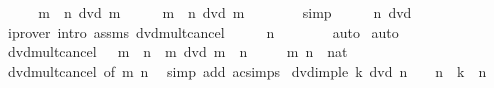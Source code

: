 \begin{isabellebody}
%
\isadelimproof
%
\endisadelimproof
%
\isatagproof
{}\isamarkupfalse%
\ \isanewline
\ \ \isamarkupfalse%
\ {\isachardoublequoteopen}m\ {\isacharasterisk}{\kern0pt}\ n\ dvd\ m{\isachardoublequoteclose}\isanewline
\ \ \isamarkupfalse%
\ \isamarkupfalse%
\ {\isachardoublequoteopen}m\ {\isacharasterisk}{\kern0pt}\ n\ dvd\ m\ {\isacharasterisk}{\kern0pt}\ {}{\isachardoublequoteclose}\isanewline
\ \ \ \ \isamarkupfalse%
\ simp\isanewline
\ \ \isamarkupfalse%
\ \isamarkupfalse%
\ {\isachardoublequoteopen}n\ dvd\ {}{\isachardoublequoteclose}\isanewline
\ \ \ \ \isamarkupfalse%
\ {\isacharparenleft}{\kern0pt}iprover\ intro{\isacharcolon}{\kern0pt}\ assms\ dvd{\isacharunderscore}{\kern0pt}mult{\isacharunderscore}{\kern0pt}cancel{\isacharparenright}{\kern0pt}\isanewline
\ \ \isamarkupfalse%
\ \isamarkupfalse%
\ {\isachardoublequoteopen}n\ {\isacharequal}{\kern0pt}\ {}{\isachardoublequoteclose}\isanewline
\ \ \ \ \isamarkupfalse%
\ auto\isanewline
{}\isamarkupfalse%
\ auto%
\endisatagproof
{\isafoldproof}%
%
\isadelimproof
\isanewline
%
\endisadelimproof
\isanewline
{}\isamarkupfalse%
\ dvd{\isacharunderscore}{\kern0pt}mult{\isacharunderscore}{\kern0pt}cancel{}{\isacharcolon}{\kern0pt}\ {\isachardoublequoteopen}{}\ {\isacharless}{\kern0pt}\ m\ {\isasymLongrightarrow}\ n\ {\isacharasterisk}{\kern0pt}\ m\ dvd\ m\ {\isasymlongleftrightarrow}\ n\ {\isacharequal}{\kern0pt}\ {}{\isachardoublequoteclose}\isanewline
\ \ \ m\ n\ {\isacharcolon}{\kern0pt}{\isacharcolon}{\kern0pt}\ nat\isanewline
%
\isadelimproof
\ \ %
\endisadelimproof
%
\isatagproof
{}\isamarkupfalse%
\ dvd{\isacharunderscore}{\kern0pt}mult{\isacharunderscore}{\kern0pt}cancel{}\ {\isacharbrackleft}{\kern0pt}of\ m\ n{\isacharbrackright}{\kern0pt}\ \isamarkupfalse%
\ {\isacharparenleft}{\kern0pt}simp\ add{\isacharcolon}{\kern0pt}\ ac{\isacharunderscore}{\kern0pt}simps{\isacharparenright}{\kern0pt}%
\endisatagproof
{\isafoldproof}%
%
\isadelimproof
\isanewline
%
\endisadelimproof
\isanewline
{}\isamarkupfalse%
\ dvd{\isacharunderscore}{\kern0pt}imp{\isacharunderscore}{\kern0pt}le{\isacharcolon}{\kern0pt}\ {\isachardoublequoteopen}k\ dvd\ n\ {\isasymLongrightarrow}\ {}\ {\isacharless}{\kern0pt}\ n\ {\isasymLongrightarrow}\ k\ {\isasymle}\ n{\isachardoublequoteclose}\isanewline

\end{isabellebody}
